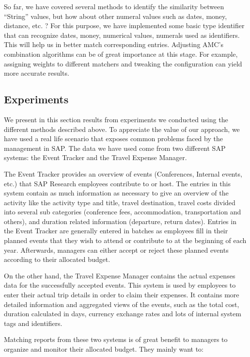 So far, we have covered several methods to identify the similarity between ``String'' values, but how about other numeral values such as dates, money, distance, etc. ? For this purpose, we have implemented some basic type identifier that can recognize dates, money, numerical values, numerals used as identifiers. This will help us in better match corresponding entries. Adjusting AMC's combination algorithms can be of great importance at this stage. For example, assigning weights to different matchers and tweaking the configuration can yield more accurate results.



\subsection{Experiments}
We present in this section results from experiments we conducted using the different methods described above. To appreciate the value of our approach, we have used a real life scenario that exposes common problems faced by the management in SAP. The data we have used come from two different SAP systems: the Event Tracker and the Travel Expense Manager.

The Event Tracker provides an overview of events (Conferences, Internal events, etc.) that SAP Research employees contribute to or host. The entries in this system contain as much information as necessary to give an overview of the activity like the activity type and title, travel destination, travel costs divided into several sub categories (conference fees, accommodation, transportation and others), and duration related information (departure, return dates). Entries in the Event Tracker are generally entered in batches as employees fill in their planned events that they wish to attend or contribute to at the beginning of each year. Afterwards, managers can either accept or reject these planned events according to their allocated budget.

On the other hand, the Travel Expense Manager contains the actual expenses data for the successfully accepted events. This system is used by employees to enter their actual trip details in order to claim their expenses. It contains more detailed information and aggregated views of the events, such as the total cost, duration calculated in days, currency exchange rates and lots of internal system tags and identifiers.

Matching reports from these two systems is of great benefit to managers to organize and monitor their allocated budget. They mainly want to:

